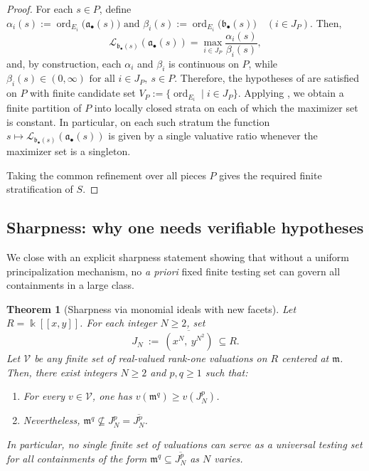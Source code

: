 \documentclass[12pt]{amsart}
\newcommand{\m}{\mathfrak m}
\newcommand{\ord}{\operatorname{\mathrm{ord}}}
\renewcommand{\a}{\mathfrak{a}}
\renewcommand{\b}{\mathfrak{b}}
\newcommand{\Loj}{\mathcal{L}} %
\newcommand{\abul}{{\a_\bullet}}
\newcommand{\bbul}{{\b_\bullet}}
\theoremstyle{plain}
\newtheorem{theorem}{Theorem}[section]
\theoremstyle{definition}
\numberwithin{equation}{section}
\begin{document}
\begin{proof}
	For each $s\in P$, define
	$
	\alpha_i(s):=\ord_{E_i}\bigl(\abul(s)\bigr) \text{ and }
	\beta_i(s):=\ord_{E_i}\bigl(\bbul(s)\bigr)
	\quad (i\in J_P).
	$
	Then,
	\[
	\Loj_{\bbul(s)}(\abul(s))
	=
	\max_{i\in J_P}\frac{\alpha_i(s)}{\beta_i(s)},
	\]
	and, by construction, each $\alpha_i$ and $\beta_i$ is continuous on $P$, while
	$
	\beta_i(s)\in (0,\infty) \text{ for all } i\in J_P,\ s\in P.
	$
	Therefore, the hypotheses of  are satisfied on $P$ with finite candidate set
	$
	V_P:=\{\ord_{E_i}\mid i\in J_P\}.
	$
	Applying , we obtain a finite partition of $P$ into locally closed strata on each of which the maximizer set is constant. In particular, on each such stratum the function
	$
	s\longmapsto \Loj_{\bbul(s)}(\abul(s))
	$
	is given by a single valuative ratio whenever the maximizer set is a singleton.
	
	Taking the common refinement over all pieces $P$ gives the required finite stratification of $S$.
\end{proof}


\subsection{Sharpness: why one needs verifiable hypotheses}\label{subsec:sharpness}

We close with an explicit sharpness statement showing that without a uniform principalization
mechanism, no \emph{a priori} fixed finite testing set can govern all containments in a large class.

\begin{theorem}[Sharpness via monomial ideals with new facets]\label{thm:sharpness-monomial}
	Let $R=\Bbbk[[x,y]]$.  For each integer $N\ge 2$, set
	\[
	J_N\ :=\ \overline{(x^N,\ y^{N^2})}\ \subseteq R.
	\]
	Let $\mathcal V$ be any finite set of real-valued rank-one valuations on $R$ centered at $\m$.
	Then, there exist integers $N\ge 2$ and $p,q\ge 1$ such that:
	\begin{enumerate}
		\item For every $v\in \mathcal V$, one has $v(\m^q)\ge v(J_N^p)$.
		\item Nevertheless, $\m^q\not\subseteq J_N^p = \overline{J_N^p}$.
	\end{enumerate}
	In particular, no single finite set of valuations can serve as a universal testing set for all
	containments of the form $\m^q\subseteq \overline{J_N^p}$ as $N$ varies.
\end{theorem}
\end{document}
